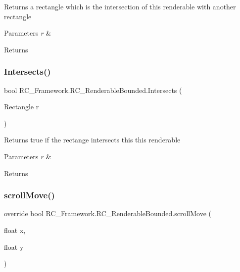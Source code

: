 Returns a rectangle which is the intersection of this renderable with another rectangle 


\begin{DoxyParams}{Parameters}
{\em r} & \\
\hline
\end{DoxyParams}
\begin{DoxyReturn}{Returns}

\end{DoxyReturn}
\mbox{\label{class_r_c___framework_1_1_r_c___renderable_bounded_a394581a8ad6bf9a472214fe4316ea37c}} 
\subsubsection{\texorpdfstring{Intersects()}{Intersects()}}
{\footnotesize\ttfamily bool R\+C\+\_\+\+Framework.\+R\+C\+\_\+\+Renderable\+Bounded.\+Intersects (\begin{DoxyParamCaption}\item[{Rectangle}]{r }\end{DoxyParamCaption})}



Returns true if the rectange intersects this this renderable 


\begin{DoxyParams}{Parameters}
{\em r} & \\
\hline
\end{DoxyParams}
\begin{DoxyReturn}{Returns}

\end{DoxyReturn}
\mbox{\label{class_r_c___framework_1_1_r_c___renderable_bounded_a000dd516577e50fb39fc3e1acc774435}} 
\subsubsection{\texorpdfstring{scroll\+Move()}{scrollMove()}}
{\footnotesize\ttfamily override bool R\+C\+\_\+\+Framework.\+R\+C\+\_\+\+Renderable\+Bounded.\+scroll\+Move (\begin{DoxyParamCaption}\item[{float}]{x,  }\item[{float}]{y }\end{DoxyParamCaption})\hspace{0.3cm}{\ttfamily [virtual]}}



